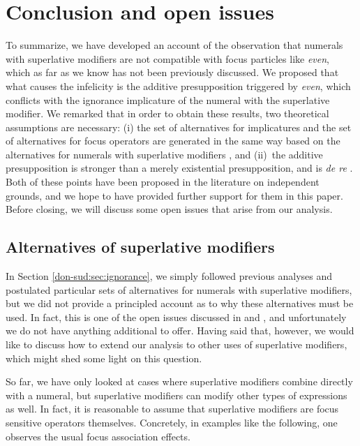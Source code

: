 \documentclass[output=paper]{langscibook}
\begin{document}
  
 \section{Conclusion and open issues}
 \label{don-sud:sec:conclusion}

To summarize, we have developed an account of the observation that numerals with superlative modifiers are not compatible with focus particles like \textit{even}, which as far as we know has not been previously discussed. We proposed that what causes the infelicity is the additive presupposition triggered by \textit{even}, which conflicts with the ignorance implicature of the numeral with the superlative modifier. We remarked that in order to obtain these results, two theoretical assumptions are necessary: (i) the set of alternatives for implicatures and the set of alternatives for focus operators are generated in the same way based on the alternatives for numerals with superlative modifiers \citep{foxkatzir, rooth:92, mendia}, and (ii)~the additive presupposition is stronger than a merely existential presupposition, and is \textit{de re} \citep{kripke, geurtsvandersandt}. Both of these points have been proposed in the literature on independent grounds, and we hope to have provided further support for them in this paper. Before closing, we will discuss some open issues that arise from our analysis.

\subsection{Alternatives of superlative modifiers}

In Section \ref{don-sud:sec:ignorance}, we simply followed previous analyses and postulated particular sets of alternatives for numerals with superlative modifiers, but we did not provide a principled account as to why these alternatives must be used. In fact, this is one of the open issues discussed in \citet{schwarz} and \citet{mayr}, and unfortunately we do not have anything additional to offer. Having said that, however, we would like to discuss how to extend our analysis to other uses of superlative modifiers, which might shed some light on this question.

So far, we have only looked at cases where superlative modifiers combine directly with a numeral, but superlative modifiers can modify other types of expressions as well. In fact, it is reasonable to assume that superlative modifiers are focus sensitive operators themselves. Concretely, in examples like the following, one observes the usual focus association effects.
\end{document}
